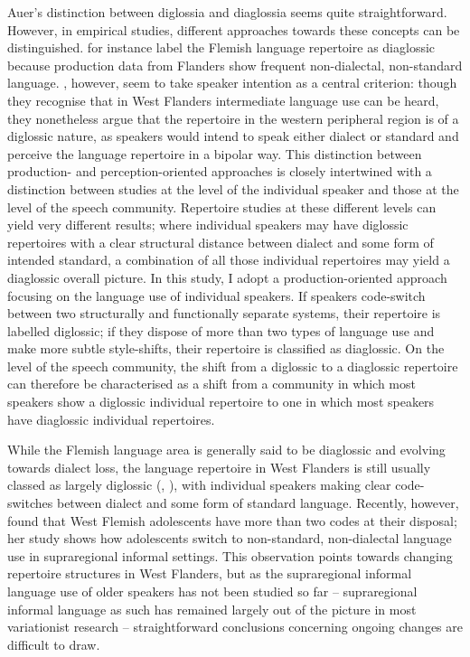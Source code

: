 \documentclass[output=paper]{LSP/langsci}
\begin{document}
Auer’s distinction between diglossia and diaglossia seems quite straightforward. However, in empirical studies, different approaches towards these concepts can be distinguished. \citet{rys_fonologische_2007} for instance label the Flemish language repertoire as diaglossic because production data from Flanders show frequent non-dialectal, non-standard language. \citet{willemyns_diglossie_2008}, however, seem to take speaker intention as a central criterion: though they recognise that in West Flanders intermediate language use can be heard, they nonetheless argue that the repertoire in the western peripheral region is of a diglossic nature, as speakers would intend to speak either dialect or standard and perceive the language repertoire in a bipolar way. This distinction between production- and perception-oriented approaches is closely intertwined with a distinction between studies at the level of the individual speaker and those at the level of the speech community. Repertoire studies at these different levels can yield very different results; where individual speakers may have diglossic repertoires with a clear structural distance between dialect and some form of intended standard, a combination of all those individual repertoires may yield a diaglossic overall picture. In this study, I adopt a production-oriented approach focusing on the language use of individual speakers. If speakers code-switch between two structurally and functionally separate systems, their repertoire is labelled diglossic; if they dispose of more than two types of language use and make more subtle style-shifts, their repertoire is classified as diaglossic. On the level of the speech community, the shift from a diglossic to a diaglossic repertoire can therefore be characterised as a shift from a community in which most speakers show a diglossic individual repertoire to one in which most speakers have diaglossic individual repertoires. 

While the Flemish language area is generally said to be diaglossic and evolving towards dialect loss, the language repertoire in West Flanders is still usually classed as largely diglossic (\citealt{de_caluwe_tussentaal_2009}, \citealt{willemyns_diglossie_2008}), with individual speakers making clear code-switches between dialect and some form of standard language. Recently, however, \citet{gabel_taalaccommodatie_2010} found that West Flemish adolescents have more than two codes at their disposal; her study shows how adolescents switch to non-standard, non-dialectal language use in supraregional informal settings. This observation points towards changing repertoire structures in West Flanders, but as the supraregional informal language use of older speakers has not been studied so far – supraregional informal language as such has remained largely out of the picture in most variationist research – straightforward conclusions concerning ongoing changes are difficult to draw.
\end{document}
